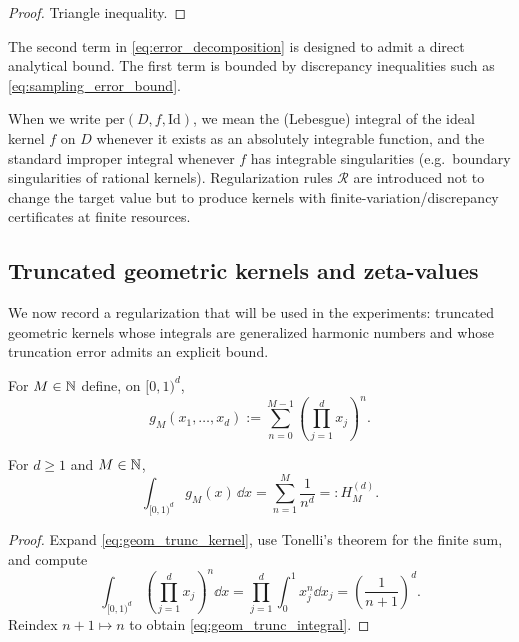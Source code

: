 \begin{proof}
Triangle inequality.
\end{proof}

The second term in \eqref{eq:error_decomposition} is designed to admit a direct analytical bound. The first term is bounded by discrepancy inequalities such as \eqref{eq:sampling_error_bound}.

\begin{remark}
\label{rem:per_id_convention}
When we write $\mathrm{per}(D,f,\mathrm{Id})$, we mean the (Lebesgue) integral of the ideal kernel $f$ on $D$ whenever it exists as an absolutely integrable function, and the standard improper integral whenever $f$ has integrable singularities (e.g.\ boundary singularities of rational kernels). Regularization rules $\mathcal{R}$ are introduced not to change the target value but to produce kernels with finite-variation/discrepancy certificates at finite resources.
\end{remark}

\subsection{Truncated geometric kernels and zeta-values}
\label{sec:zeta_truncation}

We now record a regularization that will be used in the experiments: truncated geometric kernels whose integrals are generalized harmonic numbers and whose truncation error admits an explicit bound.

\begin{definition}
\label{def:geom_trunc_kernel}
For $M\in\mathbb{N}$ define, on $[0,1)^d$,
\begin{equation}
\label{eq:geom_trunc_kernel}
g_M(x_1,\dots,x_d) := \sum_{n=0}^{M-1}\left(\prod_{j=1}^d x_j\right)^n.
\end{equation}
\end{definition}

\begin{lemma}
\label{lem:geom_trunc_integral}
For $d\ge 1$ and $M\in\mathbb{N}$,
\begin{equation}
\label{eq:geom_trunc_integral}
\int_{[0,1)^d} g_M(x)\,\dd x = \sum_{n=1}^M \frac{1}{n^d}=:H_M^{(d)}.
\end{equation}
\end{lemma}

\begin{proof}
Expand \eqref{eq:geom_trunc_kernel}, use Tonelli's theorem for the finite sum, and compute
\[
\int_{[0,1)^d}\left(\prod_{j=1}^d x_j\right)^n \dd x
=\prod_{j=1}^d \int_0^1 x_j^n \dd x_j
=\left(\frac{1}{n+1}\right)^d.
\]
Reindex $n+1\mapsto n$ to obtain \eqref{eq:geom_trunc_integral}.
\end{proof}

